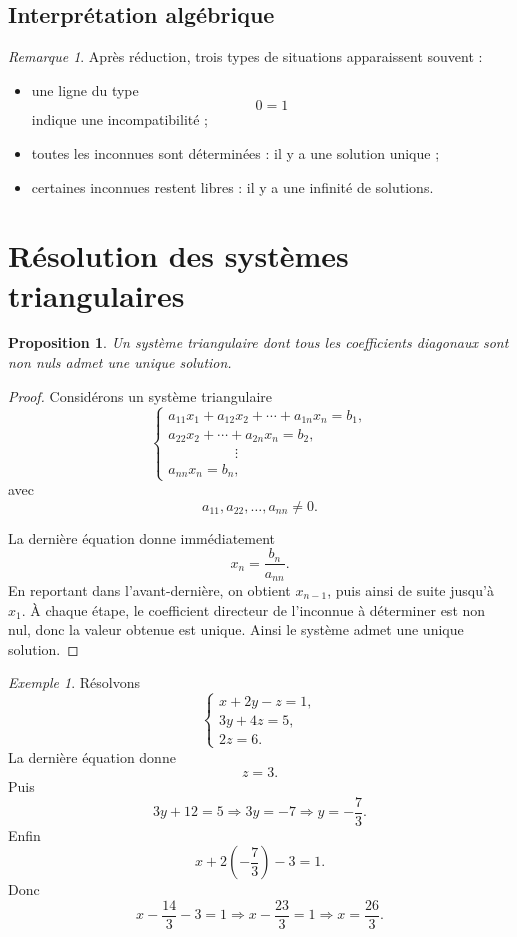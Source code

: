 \documentclass[11pt,a4paper]{article}
\newtheorem{proposition}[definition]{Proposition}
\theoremstyle{remark}
\newtheorem{remarque}[definition]{Remarque}
\newtheorem{exemple}[definition]{Exemple}
\begin{document}
\subsection{Interprétation algébrique}

\begin{remarque}
Après réduction, trois types de situations apparaissent souvent :
\begin{itemize}
    \item une ligne du type
    \[
    0=1
    \]
    indique une incompatibilité ;
    \item toutes les inconnues sont déterminées : il y a une solution unique ;
    \item certaines inconnues restent libres : il y a une infinité de solutions.
\end{itemize}
\end{remarque}

\section{Résolution des systèmes triangulaires}

\begin{proposition}
Un système triangulaire dont tous les coefficients diagonaux sont non nuls admet une unique solution.
\end{proposition}

\begin{proof}
Considérons un système triangulaire
\[
\begin{cases}
a_{11}x_1+a_{12}x_2+\cdots+a_{1n}x_n=b_1,\\
a_{22}x_2+\cdots+a_{2n}x_n=b_2,\\
\hspace{2cm}\vdots\\
a_{nn}x_n=b_n,
\end{cases}
\]
avec
\[
a_{11},a_{22},\dots,a_{nn}\neq 0.
\]

La dernière équation donne immédiatement
\[
x_n=\frac{b_n}{a_{nn}}.
\]
En reportant dans l’avant-dernière, on obtient \(x_{n-1}\), puis ainsi de suite jusqu’à \(x_1\). À chaque étape, le coefficient directeur de l’inconnue à déterminer est non nul, donc la valeur obtenue est unique. Ainsi le système admet une unique solution.
\end{proof}

\begin{exemple}
Résolvons
\[
\begin{cases}
x+2y-z=1,\\
3y+4z=5,\\
2z=6.
\end{cases}
\]
La dernière équation donne
\[
z=3.
\]
Puis
\[
3y+12=5 \Longrightarrow 3y=-7 \Longrightarrow y=-\frac73.
\]
Enfin
\[
x+2\left(-\frac73\right)-3=1.
\]
Donc
\[
x-\frac{14}{3}-3=1
\Longrightarrow
x-\frac{23}{3}=1
\Longrightarrow
x=\frac{26}{3}.
\]
\end{exemple}
\end{document}
